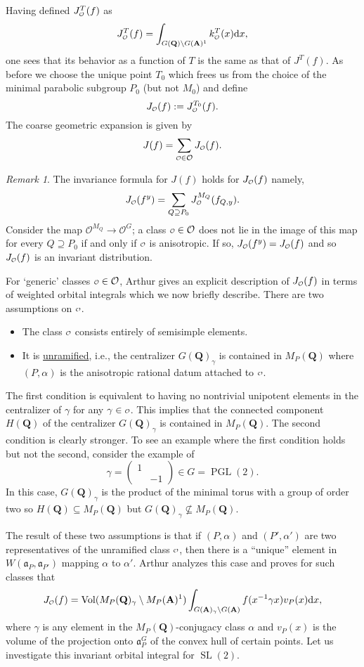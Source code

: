 \documentclass[11pt]{amsart}
\def\A{\mathbf A}
\def\Q{\mathbf Q}
\def\O{\mathcal O}
\def\o{\scalebox{0.8}{$\scriptstyle\mathcal{O}$}}
\def\aaa{\mathfrak a}
\def\d{\text d}
\def\bs{\setminus}
\def\sl{\operatorname{SL}}
\def\vol{\operatorname{Vol}}
\theoremstyle{remark}
\newtheorem{remark}[theorem]{Remark}
\begin{document}
Having defined $J_{\o}^T(f)$ as
\[ J_{\o}^T(f) = \int_{G(\Q) \bs G(\A)^1} k_{\o}^T(x) \d x, \]
one sees that its behavior as a function of $T$ is the same as that of $J^T(f)$. As before we choose the unique point $T_0$ which frees us from the choice of the minimal parabolic subgroup $P_0$ (but not $M_0$) and define 
\[ J_{\o}(f) := J^{T_0}_{\o}(f). \]
The coarse geometric expansion is given by
\begin{equation} \label{coarse_geom}
	J(f) = \sum_{\o \in \O} J_{\o}(f). 
\end{equation}

\begin{remark}
	The invariance formula for $J(f)$ holds for $J_{\o}(f)$ namely,
	\[ J_{\o}(f^y) = \sum_{Q \supseteq P_0} J_{\o}^{M_Q}(f_{Q, y}). \]
	Consider the map $\O^{M_Q} \to \O^G$; a class $\o \in \O$ does not lie in the image of this map for every $Q \supseteq P_0$ if and only if $\o$ is anisotropic. If so, $J_{\o}(f^y) = J_{\o}(f)$ and so $J_{\o}(f)$ is an invariant distribution. 
\end{remark}

For `generic' classes $\o \in \O$, Arthur gives an explicit description of $J_{\o}(f)$ in terms of weighted orbital integrals which we now briefly describe. There are two assumptions on $\o$. 
\begin{itemize}
	\item The class $\o$ consists entirely of semisimple elements. 
	\item It is \underline{unramified}, i.e., the centralizer $G(\Q)_\gamma$ is contained in $M_P(\Q)$ where $(P, \alpha)$ is the anisotropic rational datum attached to $\o$. 
\end{itemize}
The first condition is equivalent to having no nontrivial unipotent elements in the centralizer of $\gamma$ for any $\gamma \in \o$. This implies that the connected component $H(\Q)$ of the centralizer $G(\Q)_\gamma$ is contained in $M_P(\Q)$. The second condition is clearly stronger. To see an example where the first condition holds but not the second, consider the example of 
\[ \gamma = \begin{pmatrix} 1 & \\ & -1 \end{pmatrix} \in G = \operatorname{PGL}(2). \]
In this case, $G(\Q)_\gamma$ is the product of the minimal torus with a group of order two so $H(\Q) \subseteq M_P(\Q)$ but $G(\Q)_\gamma \not\subseteq M_P(\Q)$. 

The result of these two assumptions is that if $(P, \alpha)$ and $(P', \alpha')$ are two representatives of the unramified class $\o$, then there is a ``unique'' element in $W(\aaa_P, \aaa_{P'})$ mapping $\alpha$ to $\alpha'$. Arthur analyzes this case and proves for such classes that
\begin{equation} \label{jo_anis}
	J_{\o}(f) = \vol(M_P(\Q)_\gamma \bs M_P(\A)^1) \int_{G(\A)_\gamma \bs G(\A)} f(x^{-1} \gamma x) v_P(x) \d x, 
\end{equation}
where $\gamma$ is any element in the $M_P(\Q)$-conjugacy class $\alpha$ and $v_P(x)$ is the volume of the projection onto $\aaa_P^G$ of the convex hull of certain points. Let us investigate this invariant orbital integral for $\sl(2)$. 
\end{document}
